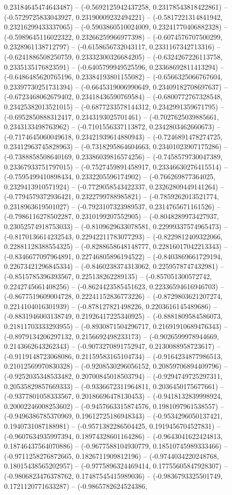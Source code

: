 0.23184645474643487) -- (-0.5692125942437258, 0.23178543818422861) -- (-0.5729725833043927, 0.23190009232494221) -- (-0.5817221314841942, 0.23216299433337065) -- (-0.5903860510024009, 0.23241770406882328) -- (-0.5989645116022322, 0.23266259966977398) -- (-0.6074576707500299, 0.2328961138712797) -- (-0.6158656732043117, 0.2331167342713316) -- (-0.6241886508250759, 0.23332300326684205) -- (-0.6324267226113758, 0.2335135176823591) -- (-0.6405799949525596, 0.23368692811413294) -- (-0.6486485620765196, 0.23384193801155082) -- (-0.6566325066767604, 0.23397730251731394) -- (-0.6645319006990649, 0.23409182708697637) -- (-0.6723468062679402, 0.23418436590769584) -- (-0.6800772767328548, 0.23425382013521015) -- (-0.6877233578144312, 0.2342991359671795) -- (-0.6952850888312417, 0.2343193025701461) -- (-0.7027625039885661, 0.2343133498763962) -- (-0.7101556337113872, 0.2342803462660673) -- (-0.7174645060049618, 0.23421939614880943) -- (-0.7246891478274725, 0.23412963745828963) -- (-0.7318295864604663, 0.23401023907175286) -- (-0.7388858508640169, 0.23386039816574256) -- (-0.7458579730047389, 0.23367933751797015) -- (-0.7527459891458917, 0.23346630276415514) -- (-0.7595499410898434, 0.2332205596174902) -- (-0.766269877364025, 0.2329413910571924) -- (-0.7729058543422337, 0.23262809449141264) -- (-0.7794579372936421, 0.2322799788985821) -- (-0.7859262013521774, 0.2318963619501027) -- (-0.7923107323989537, 0.2314765671161526) -- (-0.7986116278502287, 0.2310199207552905) -- (-0.8048289973427937, 0.23052574918753033) -- (-0.8109629633078581, 0.22999337574965473) -- (-0.8170136614232543, 0.22942211783077293) -- (-0.8229812409322066, 0.22881128388554325) -- (-0.8288658648148777, 0.22816017042213343) -- (-0.8346677097964891, 0.22746805896194522) -- (-0.8403869661729194, 0.22673421296845334) -- (-0.8460238374313062, 0.2259578747432981) -- (-0.8515785396393567, 0.225138262289135) -- (-0.857051300572742, 0.2242745661408256) -- (-0.8624423585451623, 0.22336594616946703) -- (-0.8677519609004728, 0.22241152836773226) -- (-0.8729803621207274, 0.2214104016301939) -- (-0.878127821498226, 0.2203616145489686) -- (-0.8831946003138749, 0.21926417225340925) -- (-0.8881809584586073, 0.21811703333293955) -- (-0.8930871504296717, 0.21691910689476343) -- (-0.8979134206297132, 0.2156692498233173) -- (-0.9026599978944669, 0.2143662643262343) -- (-0.9073270891752947, 0.2130088958723617) -- (-0.9119148723068086, 0.21159583165104734) -- (-0.9164234877986513, 0.21012569970830328) -- (-0.9208530296056152, 0.20859706894409796) -- (-0.9252035348533482, 0.20700845018503794) -- (-0.9294749725297311, 0.20535829857669333) -- (-0.9336672311964811, 0.2036450175677661) -- (-0.9377801058333567, 0.20186696478130453) -- (-0.9418132839998924, 0.20002246008253602) -- (-0.9457663315874576, 0.1981097961538557) -- (-0.9496386785370969, 0.19612725186948343) -- (-0.9534296050137421, 0.1940731087188981) -- (-0.9571382286504425, 0.1919456704527831) -- (-0.9607634935997394, 0.18974328601164286) -- (-0.9643041622424813, 0.18746437564070886) -- (-0.9677588104930779, 0.18510745989333466) -- (-0.9711258276872665, 0.1826711909812196) -- (-0.9744034220248768, 0.18015438565202957) -- (-0.9775896324469414, 0.17755605847928307) -- (-0.9806823476378762, 0.17487545415989036) -- (-0.9836793325501749, 0.1721120771633287) -- (-0.9865782624524386, 
